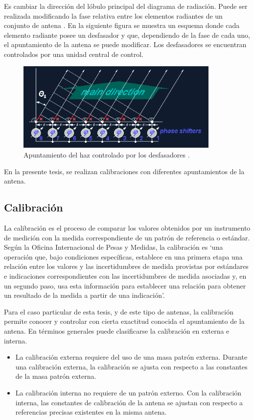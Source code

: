 Es cambiar la dirección del lóbulo principal del diagrama de radiación. Puede ser realizada modificando la fase relativa entre
los elementos radiantes de un conjunto de antena \cite{Standard1996}. En la siguiente figura se muestra un esquema donde cada 
elemento radiante posee un desfasador y que, dependiendo de la fase de cada uno, el apuntamiento de la antena se puede modificar.
Los desfasadores se encuentran controlados por una unidad central de control.

\begin{figure}[H]
 \centering
 \includegraphics[width=10cm]{gfx/beamSteering.png}
 \caption{Apuntamiento del haz controlado por los desfasadores \cite{BeamSteering}.}
\end{figure}

En la presente tesis, se realizan calibraciones con diferentes apuntamientos de la antena. 

\subsection{Calibración}

La calibración es el proceso de comparar los valores obtenidos por un instrumento de medición con la
medida correspondiente de un patrón de referencia o estándar. Según la Oficina Internacional de Pesas y Medidas, la 
calibración es \enquote*{una operación que, bajo condiciones específicas, establece en una primera etapa una relación entre
los valores y las incertidumbres de medida provistas por estándares e indicaciones correspondientes con las incertidumbres de 
medida asociadas y, en un segundo paso, usa esta información para establecer una relación para obtener un resultado de la 
medida a partir de una indicación}.

Para el caso particular de esta tesis, y de este tipo de antenas, la calibración permite conocer y controlar con cierta 
exactitud conocida el apuntamiento de la antena. En términos generales puede clasificarse la calibración en externa e interna. 
\begin{itemize}
	\item La calibración externa requiere del uso de una masa patrón externa. Durante una calibración externa, la calibración se
		ajusta con respecto a las constantes de la masa patrón externa. 
	\item La calibración interna no requiere de un patrón externo. Con la calibración interna, las constantes de calibración de
		la antena se ajustan con respecto a referencias precisas existentes en la misma antena.
\end{itemize}


